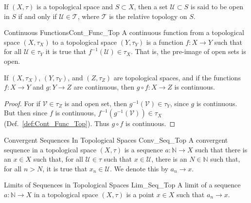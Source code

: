         \begin{definition}
            If $(X,\tau)$ is a topological space and $S\subset{X}$,
            then a set $\mathcal{U}\subset S$ is said to be open in
            $S$ if and only if $\mathcal{U}\in \mathscr{T}$, where
            $\mathscr{T}$ is the relative topology on $S$.
        \end{definition}
        \begin{ldefinition}{Continuous Functions}{Cont_Func_Top}
            A continuous function from a topological space
            $(X,\tau_{X})$ to a topological space $(Y,\tau_{Y})$ is
            a function $f:X\rightarrow{Y}$ such that for all
            $\mathcal{U}\in\tau_{Y}$ it is true that
            $f^{\minus{1}}(\mathcal{U})\in\tau_{X}$. That is,
            the pre-image of open sets is open.
        \end{ldefinition}
        \begin{theorem}
            If $(X,\tau_{X})$, $(Y,\tau_{Y})$, and $(Z,\tau_{Z})$
            are topological spaces, and if the functions
            $f:X\rightarrow{Y}$ and $g:Y\rightarrow{Z}$ are
            continuous, then $g\circ{f}:X\rightarrow{Z}$
            is continuous.
        \end{theorem}
        \begin{proof}
            For if $\mathcal{V}\in\tau_{Z}$ is and open set, then
            $g^{\minus{1}}(\mathcal{V})\in\tau_{Y}$, since $g$
            is continuous. But then since $f$ is continuous,
            $f^{\minus{1}}(g^{\minus{1}}(\mathcal{V}))\in\tau_{X}$
            (Def.~\ref{def:Cont_Func_Top}). Thus $g\circ{f}$
            is continuous.
        \end{proof}
        \begin{ldefinition}
              {Convergent Sequences In Topological Spaces}
              {Conv_Seq_Top}
            A convergent sequence in a topological space $(X,\tau)$
            is a sequence $a:\mathbb{N}\rightarrow{X}$ such that
            there is an $x\in{X}$ such that, for all
            $\mathcal{U}\in\tau$ such that $x\in\mathcal{U}$, there
            is an $N\in\mathbb{N}$ such that, for all $n>N$, it is
            true that $x_{n}\in\mathcal{U}$. We denote this by
            $a_{n}\rightarrow{x}$.
        \end{ldefinition}
        \begin{ldefinition}
              {Limits of Sequences in Topological Spaces}
              {Lim_Seq_Top}
            A limit of a sequence $a:\mathbb{N}\rightarrow{X}$ in
            a topological space $(X,\tau)$ is a point $x\in{X}$
            such that $a_{n}\rightarrow{x}$.
        \end{ldefinition}
